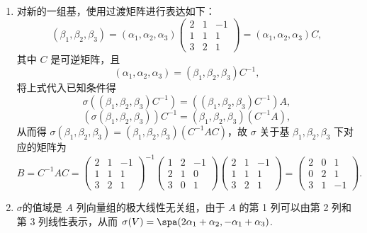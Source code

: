 \begin{solution}
    \begin{enumerate}
        \item 对新的一组基，使用过渡矩阵进行表达如下：
              \[(\beta_{1}, \beta_{2}, \beta_{3})=(\alpha_{1}, \alpha_{2}, \alpha_{3})\begin{pmatrix}
                      2 & 1 & -1 \\
                      1 & 1 & 1  \\
                      3 & 2 & 1
                  \end{pmatrix}=(\alpha_{1}, \alpha_{2}, \alpha_{3}) C,\]
              其中 $C$ 是可逆矩阵，且
              \[(\alpha_{1},\alpha_{2},\alpha_{3})=(\beta_{1},\beta_{2},\beta_{3}) C^{-1},\]
              将上式代入已知条件得
              \[\sigma((\beta_{1}, \beta_{2}, \beta_{3}) C^{-1})=((\beta_{1}, \beta_{2}, \beta_{3}) C^{-1}) A,\]
              \[(\sigma(\beta_{1}, \beta_{2}, \beta_{3})) C^{-1}=(\beta_{1}, \beta_{2}, \beta_{3})(C^{-1} A),\]
              从而得 $\sigma(\beta_{1}, \beta_{2}, \beta_{3})=(\beta_{1}, \beta_{2}, \beta_{3})(C^{-1} A C)$，故 $\sigma$ 关于基 $\beta_{1}, \beta_{2}, \beta_{3}$ 下对应的矩阵为
              \[B=C^{-1} A C = \begin{pmatrix}
                      2 & 1 & -1 \\
                      1 & 1 & 1  \\
                      3 & 2 & 1
                  \end{pmatrix}^{-1}\begin{pmatrix}
                      1 & 2 & -1 \\
                      2 & 1 & 0  \\
                      3 & 0 & 1
                  \end{pmatrix}\begin{pmatrix}
                      2 & 1 & -1 \\
                      1 & 1 & 1  \\
                      3 & 2 & 1
                  \end{pmatrix}=\begin{pmatrix}
                      2 & 0 & 1  \\
                      0 & 2 & 1  \\
                      3 & 1 & -1
                  \end{pmatrix}.\]

        \item  $\sigma$的值域是 $A$ 列向量组的极大线性无关组，由于 $ A $ 的第 1 列可以由第 2 列和第 3 列线性表示，从而 $\sigma(V)=\spa(2 \alpha_{1}+\alpha_{2}, -\alpha_{1}+\alpha_{3})$.


\end{enumerate}
\end{solution}
